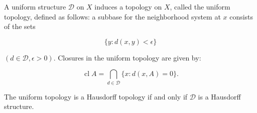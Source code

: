 A uniform structure $\mathcal{D}$ on $X$ induces a topology on $X$, called the uniform topology, defined as follows: a subbase for the neighborhood system at $x$ consists of the sets

$$\{y : d(x, y) < \epsilon\}$$

$(d \in \mathcal{D}, \epsilon > 0)$. Closures in the uniform topology are given by:

$$\operatorname{cl} A = \bigcap_{d \in \mathcal{D}} \{x : d(x, A) = 0\}.$$

The uniform topology is a Hausdorff topology if and only if $\mathcal{D}$ is a Hausdorff structure.
